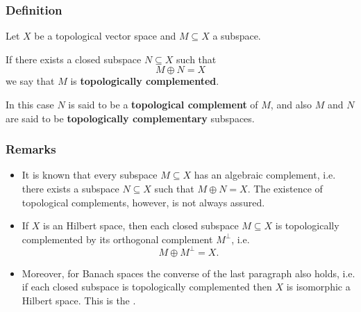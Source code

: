 \documentclass[12pt]{article}
\begin{document}
\subsubsection{Definition}
Let $X$ be a topological vector space and $M \subseteq X$ a  subspace.

If there exists a closed subspace $N \subseteq X$ such that
\begin{displaymath}
M \oplus N = X
\end{displaymath}
we say that $M$ is {\bf topologically complemented}.

In this case $N$ is said to be a {\bf topological complement} of $M$, and also $M$ and $N$ are said to be {\bf topologically complementary} subspaces.

\subsubsection{Remarks}
\begin{itemize}
\item It is known that every subspace $M \subseteq X$ has an algebraic complement, i.e. there exists a subspace $N \subseteq X$ such that $M \oplus N = X$. The existence of topological complements, however, is not always assured.
\item If $X$ is an Hilbert space, then each closed subspace $M \subseteq X$ is topologically complemented by its orthogonal complement $M^{\perp}$, i.e.
\begin{displaymath}
M \oplus M^{\perp} = X .
\end{displaymath} 
\item Moreover, for Banach spaces the converse of the last paragraph also holds, i.e. if each closed subspace is topologically complemented then $X$ is isomorphic a Hilbert space. This is the .
\end{itemize}
\end{document}
